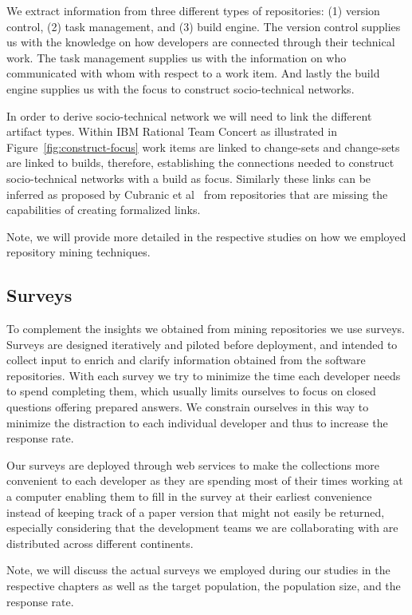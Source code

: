 We extract information from three different types of repositories: (1) version control, (2) task management, and (3) build engine.
The version control supplies us with the knowledge on how developers are connected through their technical work.
The task management supplies us with the information on who communicated with whom with respect to a work item.
And lastly the build engine supplies us with the focus to construct socio-technical networks.

In order to derive socio-technical network we will need to link the different artifact types.
Within IBM Rational Team Concert as illustrated in Figure~\ref{fig:construct-focus} work items are linked to change-sets and change-sets are linked to builds, therefore, establishing the connections needed to construct socio-technical networks with a build as focus.
Similarly these links can be inferred as proposed by Cubranic et al~\cite{cubranic:tse:2005} from repositories that are missing the capabilities of creating formalized links.

Note, we will provide more detailed in the respective studies on how we employed repository mining techniques.

\subsection{Surveys}
To complement the insights we obtained from mining repositories we use surveys.
Surveys are designed iteratively and piloted before deployment, and intended to collect input to enrich and clarify information obtained from the software repositories. 
With each survey we try to minimize the time each developer needs to spend completing them, which usually limits ourselves to focus on closed questions offering prepared answers.
We constrain ourselves in this way to minimize the distraction to each individual developer and thus to increase the response rate.

Our surveys are deployed through web services to make the collections more convenient to each developer as they are spending most of their times working at a computer enabling them to fill in the survey at their earliest convenience instead of keeping track of a paper version that might not easily be returned, especially considering that the development teams we are collaborating with are distributed across different continents.

Note, we will discuss the actual surveys we employed during our studies in the respective chapters as well as the target population, the population size, and the response rate.


